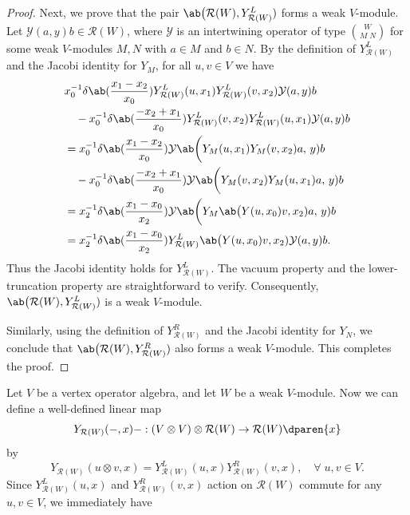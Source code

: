 \documentclass[12pt, english]{article}
\numberwithin{equation}{section}
\theoremstyle{plain}
\theoremstyle{definition}
\theoremstyle{remark}
\begin{document}
\begin{proof}
		Next, we prove that the pair $\ab\big(\mathcal{R}(W), Y^L_{\mathcal{R}(W)})$ forms a weak $V$-module.
		Let $\mathcal{Y}(a, y) b \in \mathcal{R}(W)$, where $\mathcal{Y}$ is an intertwining operator of type $\binom{W}{M\;N}$
		for some weak $V$-modules $M, N$ with $a \in M$ and $b \in N$.
		By the definition of $Y^L_{\mathcal{R}(W)}$ and the Jacobi identity for $Y_{M}$, for all $u, v \in V$ we have
		\begin{align*}
			& x_0^{-1}\delta \ab(\frac{x_1-x_2}{x_0}) Y_{\mathcal{R}(W)}^L(u, x_1) Y_{\mathcal{R}(W)}^L(v, x_2) \mathcal{Y}(a, y) b \\
			& \quad - x_0^{-1}\delta \ab(\frac{-x_2+x_1}{x_0}) Y_{\mathcal{R}(W)}^L(v, x_2) Y_{\mathcal{R}(W)}^L(u, x_1) \mathcal{Y}(a, y) b \\
			& = x_0^{-1}\delta \ab(\frac{x_1-x_2}{x_0}) \mathcal{Y} \ab\bigg(Y_{M}(u, x_1) Y_{M}(v, x_2) a, \, y) b \\
			& \quad - x_0^{-1}\delta \ab(\frac{-x_2+x_1}{x_0}) \mathcal{Y} \ab\bigg(Y_{M}(v, x_2) Y_{M}(u, x_1) a, \, y) b \\
			& = x_2^{-1}\delta \ab(\frac{x_1-x_0}{x_2}) \mathcal{Y} \ab\bigg(Y_{M} \ab\big(Y(u, x_0) v, x_2) a, \, y) b \\
			& = x_2^{-1}\delta \ab(\frac{x_1-x_0}{x_2}) Y_{\mathcal{R}(W)}^L \ab\big(Y(u, x_0) v, x_2) \mathcal{Y}(a, y) b.
		\end{align*}
		Thus the Jacobi identity holds for $Y^L_{\mathcal{R}(W)}$.
		The vacuum property and the lower-truncation property are straightforward to verify.
		Consequently, $\ab\big(\mathcal{R}(W), Y^L_{\mathcal{R}(W)})$ is a weak $V$-module.
		
		Similarly, using the definition of $Y_{\mathcal{R}(W)}^R$ and the Jacobi identity for $Y_{N}$,
		we conclude that $\ab\big(\mathcal{R}(W), Y_{\mathcal{R}(W)}^R)$ also forms a weak $V$-module.
		This completes the proof.
		
	\end{proof}
	
	Let $V$ be a vertex operator algebra, and let $W$ be a weak $V$-module.
	Now we can define a well-defined linear map
	\[
	Y_{\mathcal{R}(W)}(-, x) -: (V \otimes V) \otimes \mathcal{R}(W) \to \mathcal{R}(W) \dparen{x}
	\]
	by
	\[
	Y_{\mathcal{R}(W)}(u \otimes v, x) = Y_{\mathcal{R}(W)}^L(u, x) Y_{ \mathcal{R}(W)}^R(v, x), \quad \forall \; u, v \in V.
	\]
	Since $Y_{\mathcal{R}(W)}^L(u, x)$ and $Y_{\mathcal{R}(W)}^R(v, x)$ action on $\mathcal{R}(W)$ commute for any $u, v \in V$, we immediately have
	
\end{document}
